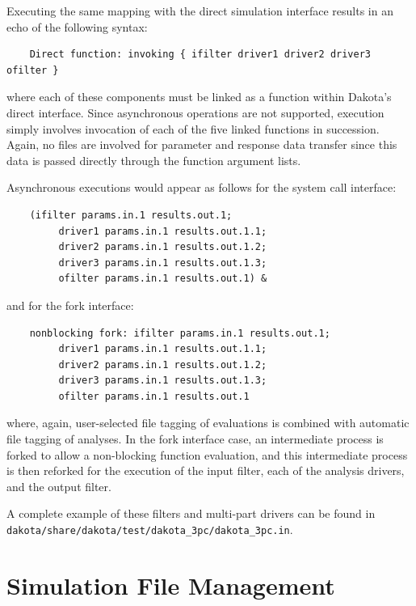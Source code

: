 Executing the same mapping with the direct simulation interface
results in an echo of the following syntax:
\begin{small}
\begin{verbatim}
    Direct function: invoking { ifilter driver1 driver2 driver3 ofilter }
\end{verbatim}
\end{small}

where each of these components must be linked as a function within
Dakota's direct interface. Since asynchronous operations are not
supported, execution simply involves invocation of each of the five
linked functions in succession. Again, no files are involved for
parameter and response data transfer since this data is passed
directly through the function argument lists.

Asynchronous executions would appear as follows for the system call
interface:
\begin{small}
\begin{verbatim}
    (ifilter params.in.1 results.out.1;
         driver1 params.in.1 results.out.1.1;
         driver2 params.in.1 results.out.1.2;
         driver3 params.in.1 results.out.1.3;
         ofilter params.in.1 results.out.1) &
\end{verbatim}
\end{small}

and for the fork interface:
\begin{small}
\begin{verbatim}
    nonblocking fork: ifilter params.in.1 results.out.1;
         driver1 params.in.1 results.out.1.1;
         driver2 params.in.1 results.out.1.2;
         driver3 params.in.1 results.out.1.3;
         ofilter params.in.1 results.out.1
\end{verbatim}
\end{small}

where, again, user-selected file tagging of evaluations is combined
with automatic file tagging of analyses. In the fork interface case,
an intermediate process is forked to allow a non-blocking function
evaluation, and this intermediate process is then reforked for the
execution of the input filter, each of the analysis drivers, and the
output filter.

A complete example of these filters and multi-part drivers can be
found in \texttt{dakota/share/dakota/test/dakota\_3pc/dakota\_3pc.in}.

\section{Simulation File Management}\label{interfaces:file}

